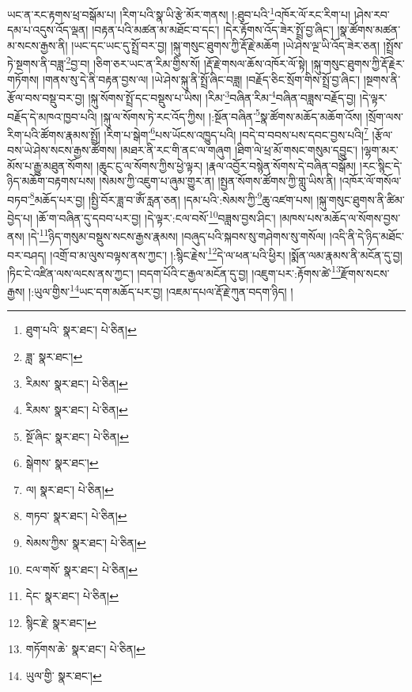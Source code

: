 ཡང་ན་རང་རྟགས་ཕྲ་བསྒོམ་པ། །རིག་པའི་སྣ་ཡི་རྩེ་མོར་གནས། །:ཐུབ་པའི་\footnote{ཐུག་པའི་  སྣར་ཐང་།  པེ་ཅིན། }འཁོར་ལོ་རང་རིག་པ། །ཤེས་རབ་དམ་པ་འདུས་འོད་ལྡན། །བརྟན་པའི་མཚན་མ་མཐོང་བ་དང་། །དེར་རྟོགས་འོད་ཟེར་སྤྲོ་བྱ་ཞིང་། །སྣ་ཚོགས་མཚན་མ་སངས་རྒྱས་ནི། །ཡང་དང་ཡང་དུ་སྤྲོ་བར་བྱ། །སྐུ་གསུང་ཐུགས་ཀྱི་རྡོ་རྗེ་མཆོག །ཡེ་ཤེས་ལྔ་ཡི་འོད་ཟེར་ཅན། །སྤྲོས་ཏེ་སྔགས་ནི་བཟླ་\footnote{ཟླ་  སྣར་ཐང་། }བྱ་བ། །ཅིག་ཅར་ཡང་ན་རིམ་གྱིས་སོ། །རྡོ་རྗེ་གསལ་ཆོས་འཁོར་ལོ་སྟེ། །སྐུ་གསུང་ཐུགས་ཀྱི་རྡོ་རྗེར་གཏོགས། །གནས་སུ་དེ་ནི་བརྟན་བྱས་ལ། །ཡེ་ཤེས་སྐུ་ནི་སྤྲོ་ཞིང་བཟླ། །བརྗོད་ཅིང་སྲོག་གིས་སྤྲོ་བྱ་ཞིང་། །སྔགས་ནི་རྩོལ་བས་བསྡུ་བར་བྱ། །སྐུ་སོགས་སྤྲོ་དང་བསྡུས་པ་ཡིས། །རིམ་\footnote{རིམས་  སྣར་ཐང་།  པེ་ཅིན། }བཞིན་རིམ་\footnote{རིམས་  སྣར་ཐང་།  པེ་ཅིན། }བཞིན་བཟླས་བརྗོད་བྱ། །དེ་ལྟར་བརྗོད་དེ་མཁའ་ཁྱབ་པའི། །སྐུ་ལ་སོགས་ཏེ་རང་འོད་ཀྱིས། །:སྔོན་བཞིན་\footnote{སྔོ་ཞིང་  སྣར་ཐང་།  པེ་ཅིན། }སྣ་ཚོགས་མཆོད་མཆོག་འོས། །སྲོག་ལས་རིག་པའི་ཚོགས་རྣམས་སྤྲོ། །རིག་པ་སྒེག་\footnote{སྒེགས་  སྣར་ཐང་། }པས་ཡོངས་འཁྱུད་པའི། །བདེ་བ་བབས་པས་དབང་བྱས་པའི།\footnote{ལ།  སྣར་ཐང་།  པེ་ཅིན། } །རྩོལ་བས་ཡེ་ཤེས་སངས་རྒྱས་ཚོགས། །མཐར་ནི་རང་གི་ནང་ལ་གཞུག །ཐིག་ལེ་ཕྲ་མོ་གསང་གསུམ་དབྱུང་། །ལྷག་མར་མོས་པ་རྒྱུ་མཐུན་སོགས། །ཆུང་ངུ་ལ་སོགས་ཀྱིས་ཕྱེ་ལྟར། །རྣལ་འབྱོར་བསྙེན་སོགས་དེ་བཞིན་བསྒོམ། །རང་སྙིང་དེ་ཉིད་མཆོག་བརྟགས་པས། །སེམས་ཀྱི་འཇུག་པ་ཞུམ་གྱུར་ན། །སྤྱན་སོགས་ཚོགས་ཀྱི་གླུ་ཡིས་ནི། །འཁོར་ལོ་གསོལ་བཏབ་\footnote{གཏབ་  སྣར་ཐང་།  པེ་ཅིན། }མཆོད་པར་བྱ། །སྤྱི་བོར་ཟླ་བ་ཨོཾ་རླན་ཅན། །དམ་པའི་:སེམས་ཀྱི་\footnote{སེམས་ཀྱིས་  སྣར་ཐང་།  པེ་ཅིན། }ཆུ་འཛག་པས། །སྐུ་གསུང་ཐུགས་ནི་ཚིམ་བྱེད་པ། །ཆོ་ག་བཞིན་དུ་དབབ་པར་བྱ། །དེ་ལྟར་:ངལ་བསོ་\footnote{ངལ་གསོ་  སྣར་ཐང་།  པེ་ཅིན། }བཟླས་བྱས་ཤིང་། །མཁས་པས་མཆོད་ལ་སོགས་བྱས་ནས། །དེ་\footnote{དེང་  སྣར་ཐང་།  པེ་ཅིན། }ཉིད་གསུམ་བསྡུས་སངས་རྒྱས་རྣམས། །བཞུད་པའི་སྐབས་སུ་གཤེགས་སུ་གསོལ། །འདི་ནི་དེ་ཉིད་མཐོང་བར་བཤད། །འགྲོ་བ་མ་ལུས་བལྟས་ནས་ཀྱང་། །:སྙིང་རྗེས་\footnote{སྙིང་རྗེ་  སྣར་ཐང་། }དེ་ལ་ཕན་པའི་ཕྱིར། །སྨོན་ལམ་རྣམས་ནི་མངོན་དུ་བྱ། །ཏིང་ངེ་འཛིན་ལས་ལངས་ནས་ཀྱང་། །བདག་པོའི་ང་རྒྱལ་མངོན་དུ་བྱ། །འཇུག་པར་:རྟོགས་ཚེ་\footnote{གཏོགས་ཆེ་  སྣར་ཐང་།  པེ་ཅིན། }རྫོགས་སངས་རྒྱས། །:ཡུལ་གྱིས་\footnote{ཡུལ་གྱི་  སྣར་ཐང་། }ཡང་དག་མཆོད་པར་བྱ། །འཇམ་དཔལ་རྡོ་རྗེ་ཀུན་བདག་ཉིད། །
